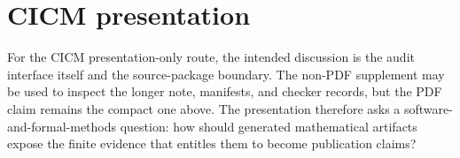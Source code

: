 \documentclass[runningheads]{llncs}
\begin{document}
\section{CICM presentation}

For the CICM presentation-only route, the intended discussion is the audit
interface itself and the source-package boundary.  The non-PDF supplement may be
used to inspect the longer note, manifests, and checker records, but the PDF
claim remains the compact one above.  The presentation therefore asks a
software-and-formal-methods question: how should generated mathematical
artifacts expose the finite evidence that entitles them to become publication
claims?



\end{document}
